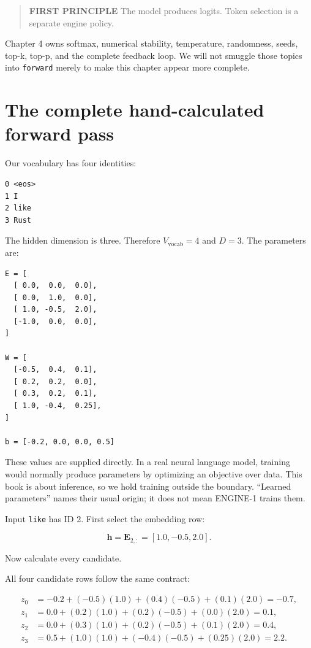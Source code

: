 \begin{quote}
\textbf{FIRST PRINCIPLE} The model produces logits. Token selection is a
separate engine policy.
\end{quote}

Chapter 4 owns softmax, numerical stability, temperature, randomness,
seeds, top-k, top-p, and the complete feedback loop. We will not smuggle
those topics into \texttt{forward} merely to make this chapter appear
more complete.

\section{The complete hand-calculated forward
pass}\label{the-complete-hand-calculated-forward-pass}

Our vocabulary has four identities:

\begin{verbatim}
0 <eos>
1 I
2 like
3 Rust
\end{verbatim}

The hidden dimension is three. Therefore \(V_{\mathrm{vocab}}=4\) and
\(D=3\). The parameters are:

\begin{verbatim}
E = [
  [ 0.0,  0.0,  0.0],
  [ 0.0,  1.0,  0.0],
  [ 1.0, -0.5,  2.0],
  [-1.0,  0.0,  0.0],
]

W = [
  [-0.5,  0.4,  0.1],
  [ 0.2,  0.2,  0.0],
  [ 0.3,  0.2,  0.1],
  [ 1.0, -0.4,  0.25],
]

b = [-0.2, 0.0, 0.0, 0.5]
\end{verbatim}

These values are supplied directly. In a real neural language model,
training would normally produce parameters by optimizing an objective
over data. This book is about inference, so we hold training outside the
boundary. ``Learned parameters'' names their usual origin; it does not
mean ENGINE-1 trains them.

Input \texttt{like} has ID 2. First select the embedding row:

\begin{equation}
\mathbf{h}=\mathbf{E}_{2,:}=[1.0,-0.5,2.0].
\end{equation}

Now calculate every candidate.

All four candidate rows follow the same contract:

\begin{equation}
\begin{aligned}
z_0&=-0.2+(-0.5)(1.0)+(0.4)(-0.5)+(0.1)(2.0)=-0.7,\\
z_1&= 0.0+(0.2)(1.0)+(0.2)(-0.5)+(0.0)(2.0)= 0.1,\\
z_2&= 0.0+(0.3)(1.0)+(0.2)(-0.5)+(0.1)(2.0)= 0.4,\\
z_3&= 0.5+(1.0)(1.0)+(-0.4)(-0.5)+(0.25)(2.0)=2.2.
\end{aligned}
\end{equation}

